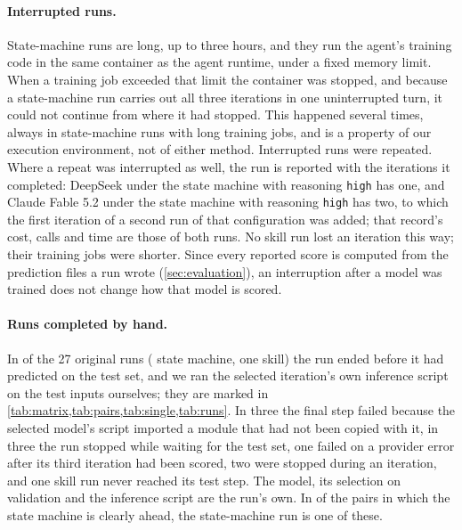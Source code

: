\paragraph{Interrupted runs.} State-machine runs are long, up to three hours, and they run the agent's training code in
the same container as the agent runtime, under a fixed memory limit. When a training job exceeded that limit the
container was stopped, and because a state-machine run carries out all three iterations in one uninterrupted turn, it
could not continue from where it had stopped. This happened several times, always in state-machine runs with long
training jobs, and is a property of our execution environment, not of either method. Interrupted runs were repeated.
Where a repeat was interrupted as well, the run is reported with the iterations it completed: DeepSeek under the state
machine with reasoning \texttt{high} has one, and Claude Fable 5.2 under the state machine with reasoning
\texttt{high} has two, to which the first iteration of a second run of that configuration was added; that record's
cost, calls and time are those of both runs. No skill run lost an iteration this way; their training jobs
were shorter. Since every reported score is computed from the prediction files a run wrote (\cref{sec:evaluation}), an
interruption after a model was trained does not change how that model is scored.

\paragraph{Runs completed by hand.} In \HandCount{} of the 27 original runs (\HandSm{} state machine, one skill) the run
ended before it had predicted on the test set, and we ran the selected iteration's own inference script on the test
inputs ourselves; they are marked in \cref{tab:matrix,tab:pairs,tab:single,tab:runs}. In three the final step failed
because the selected model's script imported a module that had not been copied with it, in three the run stopped while
waiting for the test set, one failed on a provider error after its third iteration had been scored, two were stopped
during an iteration, and one skill run never reached its test step. The model, its selection on validation and the
inference script are the run's own. In \HandSmAhead{} of the \PairsSm{} pairs in which the state machine is clearly
ahead, the state-machine run is one of these.

